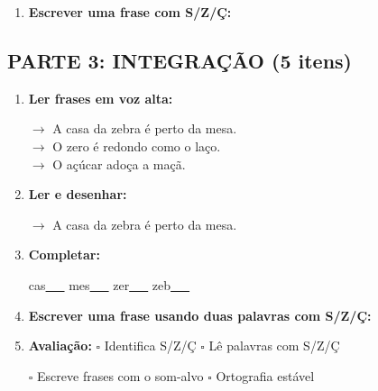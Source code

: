 \begin{exercicio}
\begin{enumerate}[resume]
  \item \textbf{Escrever uma frase com S/Z/Ç:}
  \begin{center}
  \underline{\hspace{12cm}}
  \end{center}

\end{enumerate}

\subsection*{PARTE 3: INTEGRAÇÃO (5 itens)}

\begin{enumerate}[resume]

  \item \textbf{Ler frases em voz alta:}
  \begin{center}
  $\rightarrow$ A casa da zebra é perto da mesa.\\
  $\rightarrow$ O zero é redondo como o laço.\\
  $\rightarrow$ O açúcar adoça a maçã.\\
  \end{center}

  \item \textbf{Ler e desenhar:}
  \begin{center}
  $\rightarrow$ A casa da zebra é perto da mesa.
  \end{center}
  \begin{center}
  \end{center}

  \item \textbf{Completar:}
  \begin{center}
  cas\underline{~~~} \quad mes\underline{~~~} \quad zer\underline{~~~} \quad zeb\underline{~~~}
  \end{center}

  \item \textbf{Escrever uma frase usando duas palavras com S/Z/Ç:}
  \begin{center}
  \underline{\hspace{12cm}}
  \end{center}

  \item \textbf{Avaliação:} $\square$ Identifica S/Z/Ç \quad $\square$ Lê palavras com S/Z/Ç
  \begin{center}
  $\square$ Escreve frases com o som-alvo \quad $\square$ Ortografia estável
  \end{center}


\end{enumerate}
\end{exercicio}
